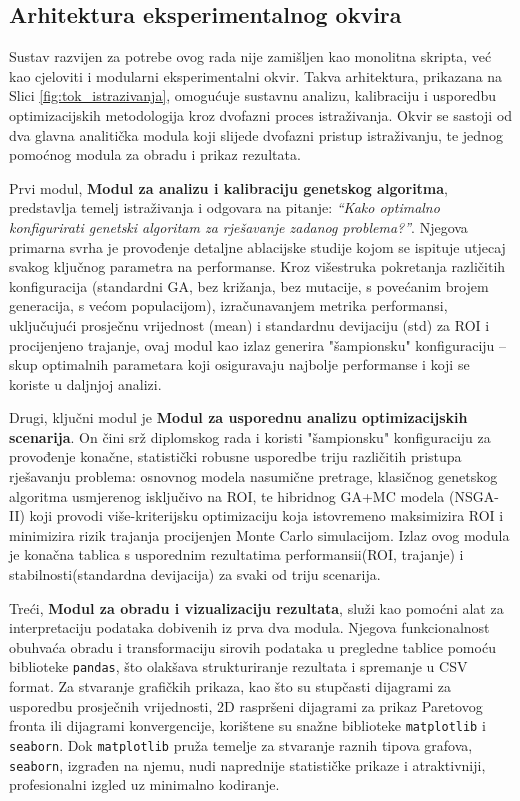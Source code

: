 \subsection{Arhitektura eksperimentalnog okvira}

Sustav razvijen za potrebe ovog rada nije zamišljen kao monolitna skripta, već kao cjeloviti i modularni eksperimentalni okvir. Takva arhitektura, prikazana na Slici \ref{fig:tok_istrazivanja}, omogućuje sustavnu analizu, kalibraciju i usporedbu optimizacijskih metodologija kroz dvofazni proces istraživanja. Okvir se sastoji od dva glavna analitička modula koji slijede dvofazni pristup istraživanju, te jednog pomoćnog modula za obradu i prikaz rezultata.

Prvi modul, \textbf{Modul za analizu i kalibraciju genetskog algoritma}, predstavlja temelj istraživanja i odgovara na pitanje: \emph{``Kako optimalno konfigurirati genetski algoritam za rješavanje zadanog problema?''}. Njegova primarna svrha je provođenje detaljne ablacijske studije kojom se ispituje utjecaj svakog ključnog parametra na performanse. Kroz višestruka pokretanja različitih konfiguracija (standardni GA, bez križanja, bez mutacije, s povećanim brojem generacija, s većom populacijom), izračunavanjem metrika performansi, uključujući prosječnu vrijednost (mean) i standardnu devijaciju (std) za ROI i procijenjeno trajanje, ovaj modul kao izlaz generira "šampionsku" konfiguraciju – skup optimalnih parametara koji osiguravaju najbolje performanse i koji se koriste u daljnjoj analizi.

    Drugi, ključni modul je \textbf{Modul za usporednu analizu optimizacijskih scenarija}. On čini srž diplomskog rada i koristi "šampionsku" konfiguraciju za provođenje konačne, statistički robusne usporedbe triju različitih pristupa rješavanju problema: osnovnog modela nasumične pretrage, klasičnog genetskog algoritma usmjerenog isključivo na ROI, te hibridnog GA+MC modela (NSGA-II) koji provodi više-kriterijsku optimizaciju koja istovremeno maksimizira ROI i minimizira rizik trajanja procijenjen Monte Carlo simulacijom.  Izlaz ovog modula je konačna tablica s usporednim rezultatima performansii(ROI, trajanje) i stabilnosti(standardna devijacija) za svaki od triju scenarija.

    Treći, \textbf{Modul za obradu i vizualizaciju rezultata}, služi kao pomoćni alat za interpretaciju podataka dobivenih iz prva dva modula. Njegova funkcionalnost obuhvaća obradu i transformaciju sirovih podataka u pregledne tablice pomoću biblioteke \texttt{pandas}, što olakšava strukturiranje rezultata i spremanje u CSV format. Za stvaranje grafičkih prikaza, kao što su stupčasti dijagrami za usporedbu prosječnih vrijednosti, 2D raspršeni dijagrami za prikaz Paretovog fronta ili dijagrami konvergencije, korištene su snažne biblioteke \texttt{matplotlib} i \texttt{seaborn}. Dok \texttt{matplotlib} pruža temelje za stvaranje raznih tipova grafova, \texttt{seaborn}, izgrađen na njemu, nudi naprednije statističke prikaze i atraktivniji, profesionalni izgled uz minimalno kodiranje.


